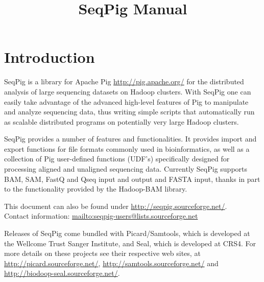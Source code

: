 \documentclass[a4paper,parskip=half,10pt,bibtotoc,abstracton,oneside,noindent,DIV15]{scrartcl}
\title{SeqPig Manual}
\begin{document}
\maketitle

\tableofcontents
\newpage

\section{Introduction}

SeqPig is a library for Apache Pig \url{http://pig.apache.org/} for the
distributed analysis of large sequencing datasets on Hadoop clusters.  With
SeqPig one can easily take advantage of the advanced high-level features of Pig
to manipulate and analyze sequencing data, thus writing simple scripts that
automatically run as scalable distributed programs on potentially very large
Hadoop clusters.

SeqPig provides a number of features and functionalities.  It provides
import and export functions for file formats commonly used in
bioinformatics, as well as a collection of Pig user-defined functions
(UDF's) specifically designed for processing aligned and unaligned
sequencing data. Currently SeqPig supports BAM, SAM, FastQ and Qseq
input and output and FASTA input, thanks in part to the functionality
provided by the Hadoop-BAM library.

This document can also be found under
\url{http://seqpig.sourceforge.net/}.\\ Contact information:
\url{mailto:seqpig-users@lists.sourceforge.net}

Releases of SeqPig come bundled with Picard/Samtools, which is
developed at the Wellcome Trust Sanger Institute, and Seal, which is
developed at CRS4. For more details on these projects see their respective web
sites, at \url{http://picard.sourceforge.net/},
\url{http://samtools.sourceforge.net/} and
\url{http://biodoop-seal.sourceforge.net/}.






\end{document}
